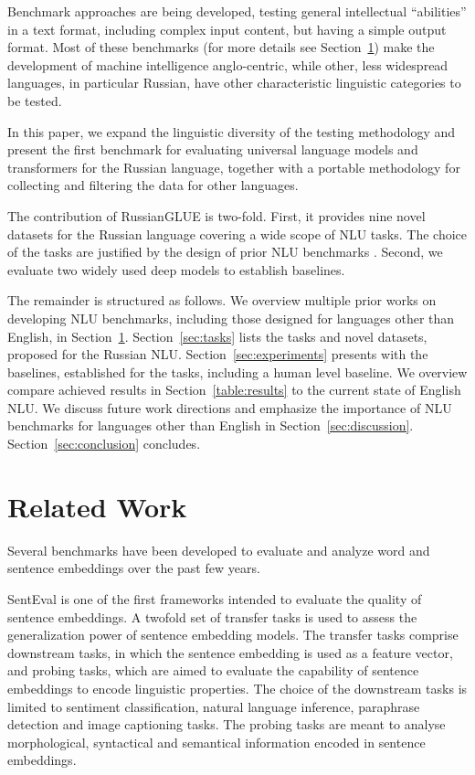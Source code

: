 \documentclass[11pt,a4paper]{article}
\begin{document}
Benchmark approaches are being developed, testing general intellectual ``abilities'' in a text format, including complex input content, but having a simple output format. Most of these benchmarks (for more details see Section~\ref{sec:related_work}) make the development of machine intelligence anglo-centric, while other, less widespread languages, in particular Russian, have other characteristic linguistic categories to be tested.

In this paper, we expand the linguistic diversity of the testing methodology and present the first benchmark for evaluating universal language models and transformers for the Russian language, together with a portable methodology for collecting and filtering the data for other languages. 


The contribution of RussianGLUE is two-fold. First, it provides nine novel datasets for the Russian language covering a wide scope of NLU tasks. The choice of the tasks are justified by the design of prior NLU benchmarks \cite{wang2018glue,wang2019superglue}. Second, we evaluate two widely used deep models to establish baselines. 

The remainder is structured as follows. We overview multiple prior works on developing NLU benchmarks, including those designed for languages other than English, in Section~\ref{sec:related_work}. Section~\ref{sec:tasks} lists the tasks and novel datasets, proposed for the Russian NLU. Section~\ref{sec:experiments} presents with the baselines, established for the tasks, including a human level baseline. We overview compare achieved results in Section~\ref{table:results} to the current state of English NLU. We discuss future work directions and emphasize the importance of NLU benchmarks for languages other than English in Section~\ref{sec:discussion}. Section~\ref{sec:conclusion} concludes.  

\section{Related Work} \label{sec:related_work}


Several benchmarks have been developed to evaluate and analyze word and sentence embeddings over the past few years. 




SentEval \cite{conneau2018senteval} is one of the first frameworks intended to evaluate the quality of sentence embeddings. A twofold set of transfer tasks is used to assess the generalization power of sentence embedding models. The transfer tasks comprise downstream tasks, in which the sentence embedding is used as a feature vector, and probing tasks, which are aimed to evaluate the capability of sentence embeddings to encode linguistic properties. The choice of the downstream tasks is limited to sentiment classification, natural language inference, paraphrase detection and image captioning tasks. The probing tasks are meant to analyse morphological, syntactical and semantical information encoded in sentence embeddings.  
\end{document}
